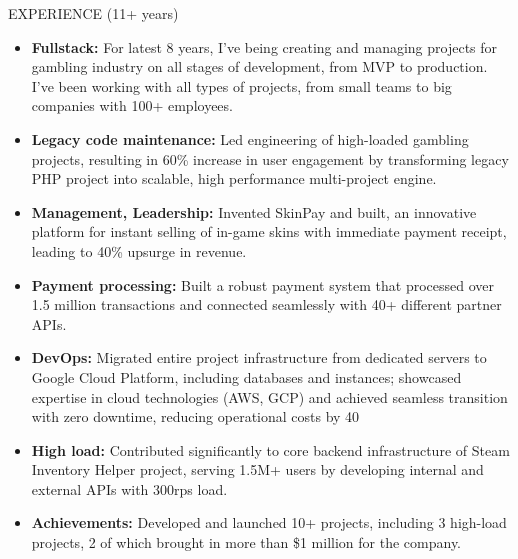 \documentclass{template} %
\begin{document}
\begin{rSection}{EXPERIENCE (11+ years)}
\begin{minipage}{0.95\textwidth}
 \begin{itemize}
    \vspace{0.1cm}
    \itemsep 1pt {} 
    \item \textbf{Fullstack:} For latest 8 years, I've being creating and managing projects for gambling industry on all stages of development, from MVP to production. I've been working with all types of projects, from small teams to big companies with 100+ employees.
    \item \textbf{Legacy code maintenance:} Led engineering of high-loaded gambling projects, resulting in 60\% increase in user
    engagement by transforming legacy PHP project into scalable, high performance multi-project engine.
    \item \textbf{Management, Leadership:} Invented SkinPay and built, an innovative platform for instant selling of in-game skins with immediate payment receipt, leading to 40\% upsurge in revenue.
    \item \textbf{Payment processing:} Built a robust payment system that processed over 1.5 million transactions and connected seamlessly with 40+ different partner APIs.
    \item \textbf{DevOps:} Migrated entire project infrastructure from dedicated servers to Google Cloud Platform, including databases and instances; showcased expertise in cloud technologies (AWS, GCP) and achieved seamless transition with zero downtime, reducing operational costs by 40%
    \item \textbf{High load:} Contributed significantly to core backend infrastructure of Steam Inventory Helper project, serving 1.5M+ users by developing internal and external APIs with 300rps load.
    \item \textbf{Achievements:} Developed and launched 10+ projects, including 3 high-load projects, 2 of which brought in more than \$1 million for the company.
 \end{itemize}
\end{minipage}

\vspace{0.5cm}


\end{rSection}
\end{document}
